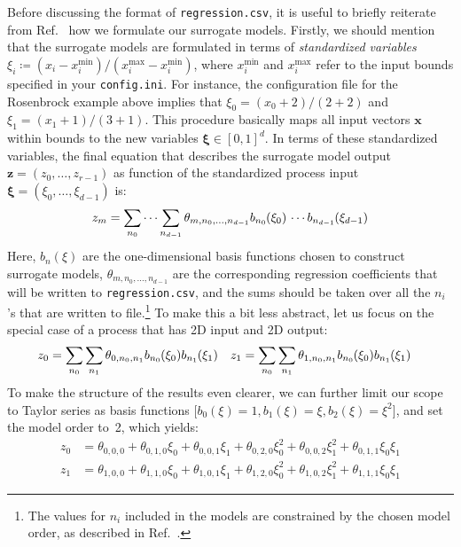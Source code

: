 \documentclass[a4paper,bibliography=numbered]{scrartcl}
\begin{document}
Before discussing the format of \texttt{regression.csv}, it is useful to briefly reiterate from Ref.~\cite{TechPaper} how we formulate our surrogate models.
Firstly, we should mention that the surrogate models are formulated in terms of \emph{standardized variables} $\xi_i \coloneq (x_i - x_i^\text{min})/(x_i^\text{max} - x_i^\text{min})$, where $x_i^\text{min}$ and $x_i^\text{max}$ refer to the input bounds specified in your \texttt{config.ini}.
For instance, the configuration file for the Rosenbrock example above implies that $\xi_0 = (x_0+2)/(2+2)$ and $\xi_1 = (x_1+1)/(3+1)$.
This procedure basically maps all input vectors $\bm{x}$ within bounds to the new variables $\bm{\xi} \in [0,1]^d$.
In terms of these standardized variables, the final equation that describes the surrogate model output~$\bm{z} = (z_0,\ldots,z_{r-1})$ as function of the standardized process input~$\bm{\xi} = (\xi_0,\ldots,\xi_{d-1})$ is:
\begin{equation}
    z_m = \sum_{n_0} \cdots \sum_{n_{d-1}} \theta_{m,n_0,\ldots,n_{d-1}}  b_{n_0}\kern-0.05em(\xi_0) \,\cdots b_{n_{d-1}}\kern-0.05em(\xi_{d-1})
\end{equation}
Here, $b_n(\xi)$ are the one-dimensional basis functions chosen to construct surrogate models, $\theta_{m,n_0,\ldots,n_{d-1}}$ are the corresponding regression coefficients that will be written to \texttt{regression.csv}, and the sums should be taken over all the $n_i$'s that are written to file.\footnote{The values for $n_i$ included in the models are constrained by the chosen model order, as described in Ref.~\cite{TechPaper}.}
To make this a bit less abstract, let us focus on the special case of a process that has 2D input and 2D output:
\begin{align}
    z_0 &= \sum_{n_0} \sum_{n_1} \theta_{0,n_0,n_1} b_{n_0}\kern-0.05em(\xi_0) b_{n_1}\kern-0.05em(\xi_1) &
    z_1 &= \sum_{n_0} \sum_{n_1} \theta_{1,n_0,n_1} b_{n_0}\kern-0.05em(\xi_0) b_{n_1}\kern-0.05em(\xi_1)
\end{align}
To make the structure of the results even clearer, we can further limit our scope to Taylor series as basis functions [$b_0(\xi) = 1, b_1(\xi) = \xi, b_2(\xi) = \xi^2$], and set the model order to~2, which yields:
\begin{equation}
    \begin{aligned}
        z_0 &= \theta_{0,0,0} + \theta_{0,1,0} \xi_0 + \theta_{0,0,1} \xi_1 + \theta_{0,2,0} \xi_0^2 + \theta_{0,0,2} \xi_1^2 + \theta_{0,1,1} \xi_0\xi_1 \\
        z_1 &= \theta_{1,0,0} + \theta_{1,1,0} \xi_0 + \theta_{1,0,1} \xi_1 + \theta_{1,2,0} \xi_0^2 + \theta_{1,0,2} \xi_1^2 + \theta_{1,1,1} \xi_0\xi_1
    \end{aligned}
\end{equation}
\end{document}
